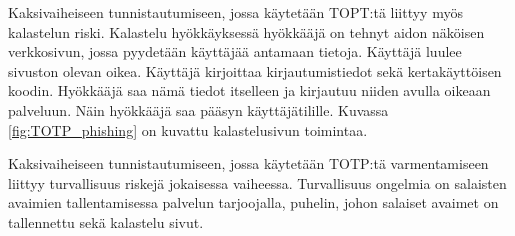 Kaksivaiheiseen tunnistautumiseen, jossa käytetään TOPT:tä liittyy myös kalastelun riski. Kalastelu hyökkäyksessä hyökkääjä on tehnyt aidon näköisen verkkosivun, jossa pyydetään käyttäjää antamaan tietoja. Käyttäjä luulee sivuston olevan oikea. Käyttäjä kirjoittaa kirjautumistiedot sekä kertakäyttöisen koodin. Hyökkääjä saa nämä tiedot itselleen ja kirjautuu niiden avulla oikeaan palveluun. Näin hyökkääjä saa pääsyn käyttäjätilille. Kuvassa \ref{fig:TOTP_phishing} on kuvattu kalastelusivun toimintaa. 
 
Kaksivaiheiseen tunnistautumiseen, jossa käytetään TOTP:tä varmentamiseen liittyy turvallisuus riskejä jokaisessa vaiheessa. Turvallisuus ongelmia on salaisten avaimien tallentamisessa palvelun tarjoojalla, puhelin, johon salaiset avaimet on tallennettu sekä kalastelu sivut. 
